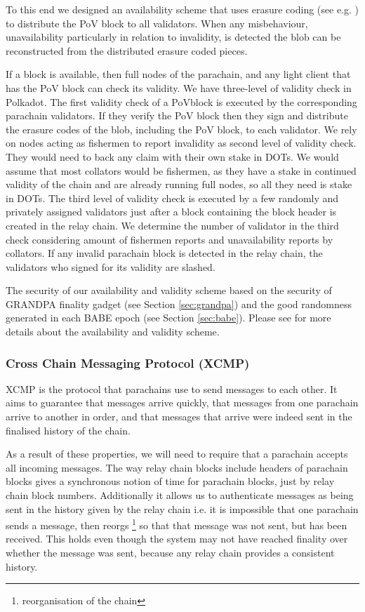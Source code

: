 To this end we designed an availability scheme that uses erasure coding (see e.g. \cite{availabilityETH2}) to distribute the PoV block to all validators.
When any misbehaviour, unavailability particularly in relation to invalidity, is detected the blob can be reconstructed from the distributed erasure coded pieces.

If a block is available, then full nodes of the parachain, and any light client that has the PoV block can check its validity. We have three-level of validity check in Polkadot. The first validity check of a PoVblock is executed by the corresponding parachain validators. If they verify the PoV block then they sign and distribute the erasure codes of the blob, including the PoV block, to each validator.
We rely on nodes acting as fishermen to report invalidity as second level of validity check. They would need to back any claim with their own stake in DOTs. We would assume that most collators would be fishermen, as they have a stake in continued validity of the chain and are already running full nodes, so all they need is stake in DOTs. The third level of validity check is executed by a few randomly and privately assigned validators just after a block containing the block header is created in the relay chain. We determine the number of validator in the third check considering amount of fishermen reports and unavailability reports by collators. If  any invalid parachain block is detected in the relay chain, the validators who signed for its validity are slashed.

The security of our availability and validity scheme based on the security of GRANDPA finality gadget (see Section \ref{sec:grandpa}) and the good randomness generated in each BABE epoch (see Section \ref{sec:babe}). Please see \cite{availandvalid} for more details about the availability and validity scheme.


\subsubsection{Cross Chain Messaging Protocol (XCMP)} \label{sec:XCMP}
XCMP is the protocol that parachains use to send messages to each other. It aims to guarantee that messages arrive quickly, that messages from one parachain arrive to another in order,
and that messages that arrive were indeed sent in the finalised history of the chain.

As a result of these properties, we will need to require that a parachain accepts all incoming messages.
The way relay chain blocks include headers of parachain blocks gives a synchronous notion of time for parachain blocks, just by relay chain block numbers. Additionally it allows us to authenticate messages as being sent in the history given by the relay chain i.e. it is impossible that one parachain sends a message, then reorgs \footnote{reorganisation of the chain} so that that message was not sent, but has been received. This holds even though the system may not have reached finality over whether the message was sent, because any relay chain provides a consistent history.

